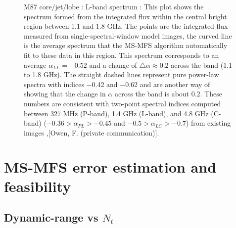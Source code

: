 \documentclass[structabstract]{stylefiles/aa}
\renewcommand{\cite}{\citep}
\begin{document}
\begin{figure}[t!]
\begin{center}
\end{center}
\caption[M87 core/jet/lobe : L-band spectrum]
{\small M87 core/jet/lobe : L-band spectrum : 
This plot shows the spectrum formed from the integrated flux within the central 
bright region between 1.1 and 1.8 GHz. The points are the integrated flux measured from single-spectral-window
model images, the curved line is the average spectrum that the MS-MFS algorithm
automatically fit to these data in this region. This spectrum corresponds to an average
$\alpha_{LL}=-0.52$ and a change of $\triangle\alpha\approx 0.2$ across the band (1.1 to 1.8 GHz).
The straight dashed lines represent pure power-law spectra with indices $-$0.42 and $-$0.62
and are another way of showing that the change in $\alpha$ across the band is about 0.2.
These numbers are consistent with two-point spectral indices computed between
327 MHz (P-band), 1.4 GHz (L-band), and 4.8 GHz (C-band) 
($-0.36 > \alpha_{PL} > -0.45$ and $-0.5 > \alpha_{LC} > -0.7$)
from existing images \cite{Owen_2000},[Owen, F. (private communication)]. 
}
\label{Fig:m87_spectrum}
\end{figure}


\section{MS-MFS error estimation and feasibility}\label{Sec:ErrorFeas}


\subsection{Dynamic-range vs $N_t$}
\end{document}

